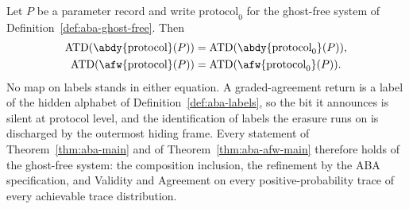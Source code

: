 \begin{theorem}
  \label{thm:aba-erasure}
  \leanok
  Let $P$ be a parameter record and write $\mathrm{protocol}_0$ for the ghost-free system of Definition~\ref{def:aba-ghost-free}.
  Then
  \[ \begin{aligned}
       \operatorname{ATD}(\abdy{\mathrm{protocol}}(P)) &= \operatorname{ATD}(\abdy{\mathrm{protocol}_0}(P)),\\
       \operatorname{ATD}(\afw{\mathrm{protocol}}(P)) &= \operatorname{ATD}(\afw{\mathrm{protocol}_0}(P)).
     \end{aligned} \]
  No map on labels stands in either equation.
  A graded-agreement return is a label of the hidden alphabet of Definition~\ref{def:aba-labels}, so the bit it announces is silent at protocol level, and the identification of labels the erasure runs on is discharged by the outermost hiding frame.
  Every statement of Theorem~\ref{thm:aba-main} and of Theorem~\ref{thm:aba-afw-main} therefore holds of the ghost-free system: the composition inclusion, the refinement by the ABA specification, and Validity and Agreement on every positive-probability trace of every achievable trace distribution.
\end{theorem}

